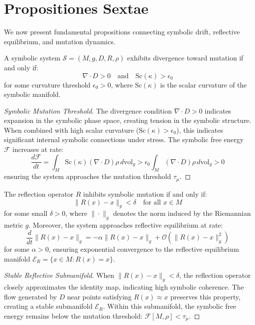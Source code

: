 \section{Propositiones Sextae}
\label{sec:bk6_propositiones_sextae}
We now present fundamental propositions connecting symbolic drift, reflective equilibrium, and mutation dynamics.
\begin{proposition}
\label{prop:bk6_structural_divergence_condition}
A symbolic system $\mathcal{S} = (M, g, D, R, \rho)$ exhibits divergence toward mutation if and only if:
\begin{equation}
\nabla \cdot D > 0 \quad \text{and} \quad \text{Sc}(\kappa) > \epsilon_0
\end{equation}
for some curvature threshold $\epsilon_0 > 0$, where $\text{Sc}(\kappa)$ is the scalar curvature of the symbolic manifold.
\begin{proof}[Symbolic Mutation Threshold]
\label{proof:bk6_symbolic_mutation_threshold}
The divergence condition $\nabla \cdot D > 0$ indicates expansion in the symbolic phase space, creating tension in the symbolic structure. When combined with high scalar curvature ($\text{Sc}(\kappa) > \epsilon_0$), this indicates significant internal symbolic connections under stress. The symbolic free energy $\mathcal{F}$ increases at rate:
\begin{equation}
\frac{d\mathcal{F}}{dt} = \int_M \text{Sc}(\kappa)(\nabla \cdot D)\rho \, d\text{vol}_g > \epsilon_0 \int_M (\nabla \cdot D)\rho \, d\text{vol}_g > 0
\end{equation}
ensuring the system approaches the mutation threshold $\tau_\mu$.
\end{proof}
\end{proposition}
\begin{proposition}
\label{prop:bk6_reflective_mutation_inhibition}
The reflection operator $R$ inhibits symbolic mutation if and only if:
\begin{equation}
\| R(x) - x \|_g < \delta \quad \text{for all } x \in M
\end{equation}
for some small $\delta > 0$, where $\|\cdot\|_g$ denotes the norm induced by the Riemannian metric $g$.
Moreover, the system approaches reflective equilibrium at rate:
\begin{equation}
\frac{d}{dt}\|R(x) - x\|_g = -\alpha \|R(x) - x\|_g + \mathcal{O}(\|R(x) - x\|_g^2)
\end{equation}
for some $\alpha > 0$, ensuring exponential convergence to the reflective equilibrium manifold $\mathcal{E}_R = \{x \in M : R(x) = x\}$.
\begin{proof}[Stable Reflective Submanifold]
\label{proof:bk6_stable_reflective_submanifold}
When $\|R(x) - x\|_g < \delta$, the reflection operator closely approximates the identity map, indicating high symbolic coherence. The flow generated by $D$ near points satisfying $R(x) \approx x$ preserves this property, creating a stable submanifold $\mathcal{E}_R$. Within this submanifold, the symbolic free energy remains below the mutation threshold: $\mathcal{F}[M, \rho] < \tau_\mu$.
\end{proof}
\end{proposition}
